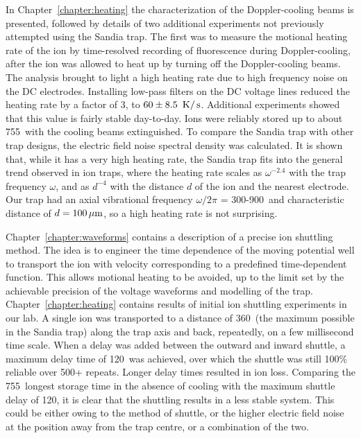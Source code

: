 In Chapter~\ref{chapter:heating} the characterization of the Doppler-cooling beams is presented, followed by details of two additional experiments not previously attempted using the Sandia trap. The first was to measure the motional heating rate of the ion by time-resolved recording of fluorescence during Doppler-cooling, after the ion was allowed to heat up by turning off the Doppler-cooling beams. The analysis brought to light a high heating rate due to high frequency noise on the DC electrodes. Installing low-pass filters on the DC voltage lines reduced the heating rate by a factor of 3, to $60\pm8.5~\,\mbox{K}/\,\mbox{s}$. Additional experiments showed that this value is fairly stable day-to-day. Ions were reliably stored up to about 755\ms\, with the cooling beams extinguished. To compare the Sandia trap with other trap designs, the electric field noise spectral density was calculated. It is shown that, while it has a very high heating rate, the Sandia trap fits into the general trend observed in ion traps, where the heating rate scales as $\omega^{-2.4}$  with the trap frequency $\omega$, and as $d^{-4}$ with the distance $d$ of the ion and the nearest electrode. Our trap had an axial vibrational frequency $\omega/2\pi$ = 300-900\kHz\, and characteristic distance of $d = 100\,\mbox{$\mu$m}$, so a high heating rate is not surprising.

Chapter~\ref{chapter:waveforms} contains a description of a precise ion shuttling method. The idea is to engineer the time dependence of the moving potential well to transport the ion with velocity corresponding to a predefined time-dependent function. This allows motional heating to be avoided, up to the limit set by the achievable precision of the voltage waveforms and modelling of the trap.  Chapter~\ref{chapter:heating} contains results of initial ion shuttling experiments in our lab. A single ion was transported to a distance of 360\um\, (the maximum possible in the Sandia trap) along the trap axis and back, repeatedly, on a few millisecond time scale. When a delay was added between the outward and inward shuttle, a maximum delay time of 120\ms\, was achieved, over which the shuttle was still 100\% reliable over 500+ repeats. Longer delay times resulted in ion loss. Comparing the 755\ms\ longest storage time in the absence of cooling with the maximum shuttle delay of 120\ms, it is clear that the shuttling results in a less stable system. This could be either owing to the method of shuttle, or the higher electric field noise at the position away from the trap centre, or a combination of the two.

